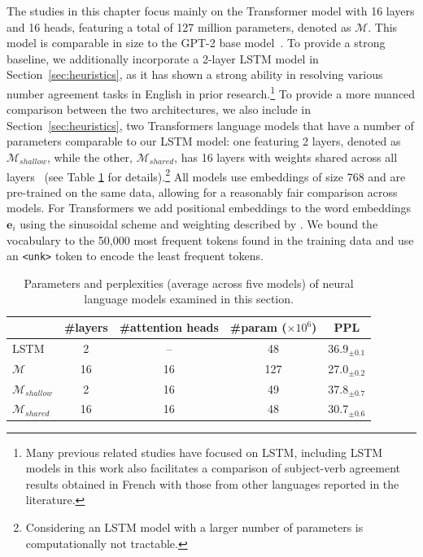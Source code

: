 The studies in this chapter focus mainly on the Transformer model with 16 layers and 16 heads, featuring a total of 127 million parameters, denoted as $\mathcal{M}$. This model is comparable in size to the GPT-2 base model~\citep{radford2019language,solaiman2019release}. To provide a strong baseline, we additionally incorporate a 2-layer LSTM model in Section~\ref{sec:heuristics}, as it has shown a strong ability in resolving various number agreement tasks in English in prior research.\footnote{Many previous related studies have focused on LSTM, including LSTM models in this work also facilitates a comparison of subject-verb agreement results obtained in French with those from other languages reported in the literature.} To provide a more nuanced comparison between the two architectures, we also include in Section~\ref{sec:heuristics}, two Transformers language models that have a number of parameters comparable to our LSTM model: one featuring 2 layers, denoted as $\mathcal{M}_{shallow}$, while the other, $\mathcal{M}_{shared}$, has 16 layers with weights shared across all layers~\citep{dehghani2018universal} (see Table \ref{tab:param} for details).\footnote{Considering an LSTM model with a larger number of parameters is computationally not tractable.} All models use embeddings of size 768 and are pre-trained on the same data, allowing for a reasonably fair comparison across models. For Transformers we add positional
embeddings to the word embeddings $\mathbf{e}_i$ using the sinusoidal
scheme and weighting described by \cite{NIPS2017_3f5ee243}.
We bound the vocabulary to the 50,000 most frequent tokens
found in the training data and use an {\verb+<unk>+} token to encode
the least frequent tokens. 


\begin{table}[ht]
    \centering
    \begin{tabular}{lcccc}
    \toprule
    & \#layers & \#attention heads &\#param ($\times 10^6$) & PPL  \\
    \midrule
    LSTM & 2& --&48 & 36.9$_{\pm 0.1}$  \\
    \midrule
    $\mathcal{M}$ & 16 &16& 127 & 27.0$_{\pm 0.2}$  \\
    $\mathcal{M}_{shallow}$ & 2& 16 &49 & 37.8$_{\pm 0.7}$  \\
    $\mathcal{M}_{shared}$& 16 & 16&48 & 30.7$_{\pm 0.6}$  \\
    \bottomrule
    \end{tabular}
    \caption{Parameters and perplexities (average across five models) of neural language models examined in this section. \label{tab:param}}
\end{table}

